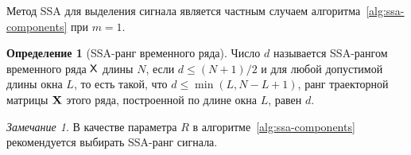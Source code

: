 \documentclass[specialist,
  substylefile = spbu.rtx,
subf,href,colorlinks=true, 12pt]{disser}
\theoremstyle{plain}
\theoremstyle{definition}
\newtheorem{definition}{Определение}[section]
\theoremstyle{remark}
\newtheorem{remark}{Замечание}[section]
\newcommand{\Input}{\textbf{Входные данные: }}
\newcommand{\Output}{\textbf{Результат: }}
\begin{document}
Метод SSA для выделения сигнала является частным случаем
алгоритма~\ref{alg:ssa-components} при $m = 1$.

\begin{definition}[SSA-ранг временного ряда]
  \label{def:ssa-rank}
  Число $d$ называется SSA-рангом временного ряда $\mathsf{X}$ длины $N$,
  если $d \leqslant (N+1) / 2$ и для любой допустимой
  длины окна $L$,
  то есть такой, что $d \leqslant \min(L, N- L + 1)$, ранг
  траекторной матрицы $\mathbf{X}$ этого ряда, построенной по
  длине окна $L$, равен $d$.
\end{definition}
\begin{remark}
  В качестве параметра $R$ в алгоритме~\ref{alg:ssa-components}
  рекомендуется выбирать SSA-ранг сигнала.
\end{remark}
\end{document}
